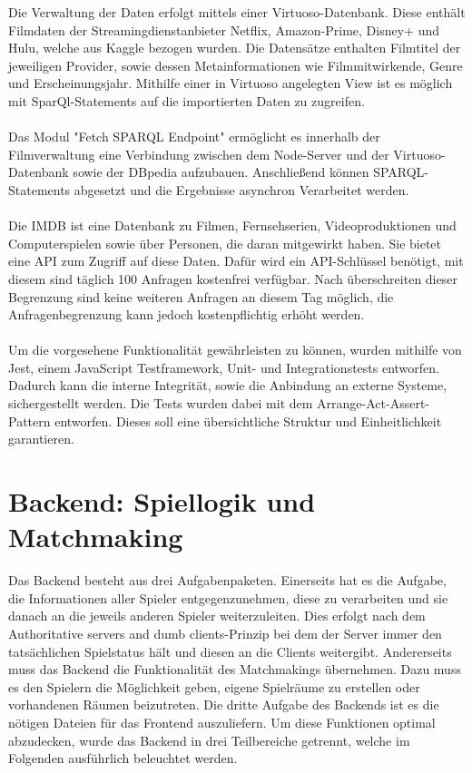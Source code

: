 \documentclass[conference]{IEEEtran}
\begin{document}
Die Verwaltung der Daten erfolgt mittels einer Virtuoso-Datenbank. Diese enthält Filmdaten der Streamingdienstanbieter
Netflix, Amazon-Prime, Disney+ und Hulu, welche aus Kaggle bezogen wurden.
Die Datensätze enthalten Filmtitel der jeweiligen Provider, sowie dessen Metainformationen wie 
Filmmitwirkende, Genre und Erscheinungsjahr. Mithilfe einer in Virtuoso angelegten View ist es möglich
mit SparQl-Statements auf die importierten Daten zu zugreifen.
\\
\\
Das Modul "Fetch SPARQL Endpoint" ermöglicht es innerhalb der Filmverwaltung eine Verbindung zwischen dem Node-Server
und der Virtuoso-Datenbank sowie der DBpedia aufzubauen. Anschließend können SPARQL-Statements abgesetzt und die Ergebnisse
asynchron Verarbeitet werden.
\\
\\
Die IMDB ist eine Datenbank zu Filmen, Fernsehserien, Videoproduktionen und Computerspielen sowie über Personen,
die daran mitgewirkt haben. Sie bietet eine API zum Zugriff auf diese Daten. Dafür wird ein API-Schlüssel benötigt, 
mit diesem sind täglich 100 Anfragen kostenfrei verfügbar. Nach überschreiten dieser Begrenzung sind keine weiteren Anfragen
an diesem Tag möglich, die Anfragenbegrenzung kann jedoch kostenpflichtig erhöht werden. 
\\
\\
Um die vorgesehene Funktionalität gewährleisten zu können, wurden mithilfe von Jest, einem JavaScript Testframework, 
Unit- und Integrationstests entworfen. Dadurch kann die interne Integrität, sowie die Anbindung an externe Systeme,
sichergestellt werden. Die Tests wurden dabei mit dem Arrange-Act-Assert-Pattern entworfen. Dieses soll eine 
übersichtliche Struktur und Einheitlichkeit garantieren.

\section{Backend: Spiellogik und Matchmaking}
Das Backend besteht aus drei Aufgabenpaketen. Einerseits hat es die Aufgabe, die Informationen aller Spieler entgegenzunehmen, diese zu verarbeiten und sie danach an die jeweils anderen Spieler weiterzuleiten. Dies erfolgt nach dem \glqq Authoritative servers and dumb clients\grqq -Prinzip bei dem der Server immer den tatsächlichen Spielstatus hält und diesen an die Clients weitergibt. Andererseits muss das Backend die Funktionalität des Matchmakings übernehmen. Dazu muss es den Spielern die Möglichkeit geben, eigene Spielräume zu erstellen oder vorhandenen Räumen beizutreten. Die dritte Aufgabe des Backends ist es die nötigen Dateien für das Frontend auszuliefern. Um diese Funktionen optimal abzudecken, wurde das Backend in drei Teilbereiche getrennt, welche im Folgenden ausführlich beleuchtet werden.
\end{document}

